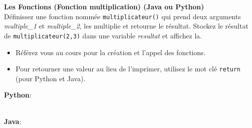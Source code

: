    \begin{Exercice}[5 minutes] \textbf{Les Fonctions (Fonction multiplication) (Java ou Python)}\\
    Définissez une fonction nommée \lstinline{multiplicateur()} qui prend deux arguments \textit{multiple\_1} et \textit{multiple\_2}, les multiplie et retourne le résultat. Stockez le résultat de \lstinline{multiplicateur(2,3)} dans une variable \textit{resultat} et affichez la.   \\

    \begin{conseil}
        \begin{itemize}
            \item Référez vous au cours pour la création et l'appel des fonctions.
            \item Pour retourner une valeur au lieu de l'imprimer, utilisez le mot clé \lstinline{return} (pour Python et Java).
        \end{itemize}        
    \end{conseil}
    \begin{solution}
        \textbf{Python}:
        
        \textbf{\\Java}:
    \end{solution}   
\end{Exercice} 
  
